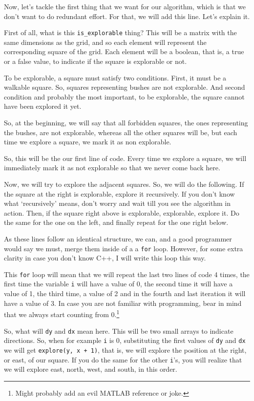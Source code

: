 \documentclass[12pt]{article}
\begin{document}
Now, let's tackle the first thing that we want for our
algorithm, which is that we don't want to do redundant effort.
For that, we will add this line. Let's explain it.

First of all, what is this \verb|is_explorable| thing?
This will be a matrix with the same dimensions as the grid, and
so each element will represent the corresponding square of the
grid. Each element will be a boolean, that is, a true or a false
value, to indicate if the square is explorable or not.

To be explorable, a square must satisfy two conditions.
First, it must be a walkable square. So, squares representing
bushes are not explorable. And second condition and probably
the most important, to be explorable, the square cannot
have been explored it yet.

So, at the beginning, we will say that all forbidden squares,
the ones representing the bushes, are not explorable,
whereas all the other squares will be, but each time
we explore a square, we mark it as non explorable.

So, this will be the our first line of code. Every time
we explore a square, we will immediately mark it as not explorable
so that we never come back here.

Now, we will try to explore the adjacent squares.
So, we will do the following. If the square at the right is
explorable, explore it recursively. If you don't know what 
`recursively' means, don't worry and wait till you see the
algorithm in action. Then, if the square right above
is explorable, explorable, explore it. Do the same for the
one on the left, and finally repeat for the one right below.

As these lines follow an identical structure, we can,
and a good programmer would say we must,
merge them inside of a a \verb|for| loop. However, for some extra clarity
in case you don't know C++, I will write this loop this way.

This \verb|for| loop will mean that we will repeat the last two
lines
of code 4 times, the first time the variable \verb|i| will have
a value of 0, the second time it will have a value of 1,
the third time, a value of 2 and in the 
fourth and last iteration it will have a value of 3.
In case you are not familiar with programming, bear in mind
that we always start counting from 0.\footnote{Might probably add
an evil MATLAB reference or joke.}

So, what will \verb|dy| and \verb|dx| mean here.
This will be two small arrays to indicate directions.
So, when for example \verb|i| is 0, substituting
the first values of \verb|dy| and \verb|dx| we will get
\verb|explore(y, x + 1)|, that is, we will explore
the position at the right, or east, of our square.
If you do the same for the other \verb|i|'s, you will realize
that we will explore east, north, west, and south, in this order.
\end{document}
